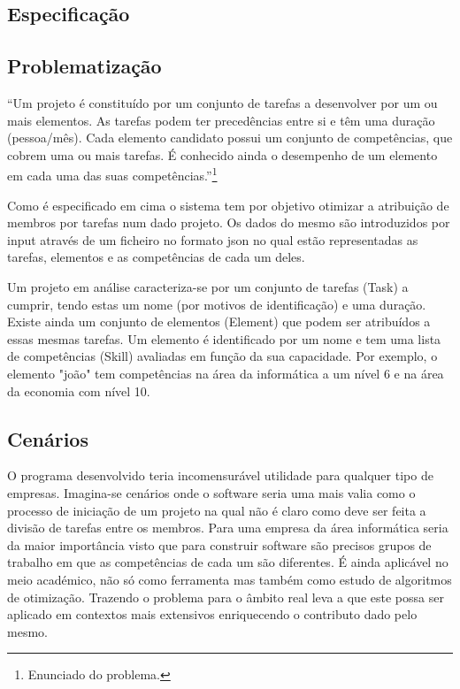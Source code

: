 \begin{titlepage}



\section{Especificação}

\subsection{Problematização}

\enquote{Um projeto é constituído por um conjunto de tarefas a desenvolver por um ou mais elementos. As tarefas podem ter precedências entre si e têm uma duração (pessoa/mês). Cada elemento candidato possui um conjunto de competências, que cobrem uma ou mais tarefas. É conhecido ainda o desempenho de um elemento em cada uma das suas competências.}\footnote{Enunciado do problema.}

\justify\normalsize
Como é especificado em cima o sistema tem por objetivo otimizar a atribuição de membros por tarefas num dado projeto. Os dados do mesmo são introduzidos por input através de um ficheiro no formato json no qual estão representadas as tarefas, elementos e as competências de cada um deles.

Um projeto em análise caracteriza-se por um conjunto de tarefas (Task) a cumprir, tendo estas um nome (por motivos de identificação) e uma duração. Existe ainda um conjunto de elementos (Element) que podem ser atribuídos a essas mesmas tarefas. Um elemento é identificado por um nome e tem uma lista de competências (Skill) avaliadas em função da sua capacidade. Por exemplo, o elemento "joão" tem competências na área da informática a um nível 6 e na área da economia com nível 10.

\subsection{Cenários}
\justify\normalsize
O programa desenvolvido teria incomensurável utilidade para qualquer tipo de empresas. Imagina-se cenários onde o software seria uma mais valia como o processo de iniciação de um projeto na qual não é claro como deve ser feita a divisão de tarefas entre os membros. Para uma empresa da área informática seria da maior importância visto que para construir software são precisos grupos de trabalho em que as competências de cada um são diferentes. É ainda aplicável no meio académico, não só como ferramenta mas também como estudo de algoritmos de otimização. Trazendo o problema para o âmbito real leva a que este possa ser aplicado em contextos mais extensivos enriquecendo o contributo dado pelo mesmo. 


\end{titlepage}
